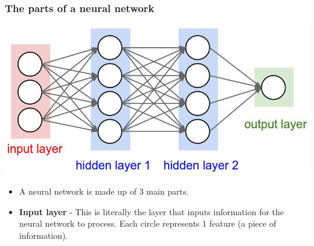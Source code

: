 \documentclass{beamer}
\begin{document}
\begin{frame}
\frametitle{The parts of a neural network}
\centering
\includegraphics[scale=0.2]{partsnn.jpeg}
\begin{itemize}
   \item A neural network is made up of 3 main parts.
   \item \textbf{Input layer} - 
This is literally the layer that inputs information for the neural network to process. Each circle represents 1 feature (a piece of information). 
  
  
   
\end{itemize}

\end{frame}

\end{document}
